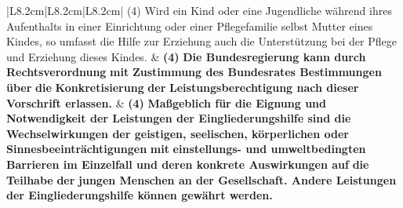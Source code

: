 \documentclass[10pt,a4paper,landscape]{article}
\begin{document}
\begin{longtable}{|L{8.2cm}|L{8.2cm}|L{8.2cm}|}
\hhline{|---|}
(4) \textcolor{diffred}{Wird ein Kind} oder \textcolor{diffred}{eine Jugendliche  \newline während ihres Aufenthalts in einer  \newline Einrichtung oder einer Pflegefamilie selbst  \newline Mutter eines Kindes, so umfasst} die \textcolor{diffred}{Hilfe  \newline zur Erziehung auch die Unterstützung bei}  \newline der \textcolor{diffred}{Pflege und Erziehung dieses Kindes.} & \textbf{(4) }\textbf{\textcolor{diffred}{Die Bundesregierung kann durch  \newline Rechtsverordnung}}\textbf{ mit }\textbf{\textcolor{diffred}{Zustimmung des  \newline Bundesrates Bestimmungen über}}\textbf{ die} \newline \textbf{\textcolor{diffred}{Konkretisierung}}\textbf{ der} \newline \textbf{\textcolor{diffred}{Leistungsberechtigung nach dieser  \newline Vorschrift erlassen.}} & \textbf{(4) }\textbf{\textcolor{diffgreen}{Maßgeblich für die Eignung und  \newline Notwendigkeit der Leistungen der  \newline Eingliederungshilfe sind die  \newline Wechselwirkungen der geistigen,  \newline seelischen, körperlichen oder  \newline Sinnesbeeinträchtigungen}}\textbf{ mit} \newline \textbf{\textcolor{diffgreen}{einstellungs- und umweltbedingten  \newline Barrieren im Einzelfall und deren  \newline konkrete Auswirkungen auf}}\textbf{ die }\textbf{\textcolor{diffgreen}{Teilhabe}}\textbf{  \newline der }\textbf{\textcolor{diffgreen}{jungen Menschen an der  \newline Gesellschaft. Andere Leistungen der  \newline Eingliederungshilfe können gewährt  \newline werden.}} \\
\hhline{|---|}

\end{longtable}
\end{document}

